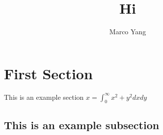 \documentclass[a4paper]{article}
\title{Hi}
\author{Marco Yang}
\begin{document}
\maketitle

\section{First Section}
This is an example section
$x = \int_{0}^{\infty} x^2 + y^2 dxdy$

\subsection{This is an example subsection}
\end{document}
